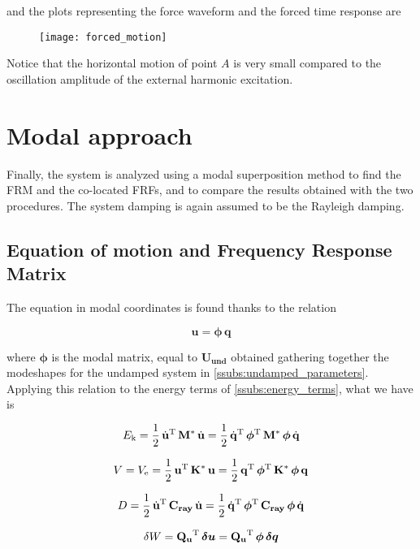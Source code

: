 \documentclass[a4paper,12pt,oneside]{article}
\begin{document}
and the plots representing the force waveform and the forced time response are

\begin{figure}[h]
	\hspace{-70pt}
	\texttt{[image: forced\_motion]}
\end{figure}

Notice that the horizontal motion of point $ A $ is very small compared to the oscillation amplitude of the external harmonic excitation.


\section{Modal approach}

Finally, the system is analyzed using a modal superposition method to find the FRM and the co-located FRFs, and to compare the results obtained with the two procedures. The system damping is again assumed to be the Rayleigh damping.

\subsection{Equation of motion and Frequency Response Matrix}

The equation in modal coordinates is found thanks to the relation

\[ \mathbf{u} = \bm{\phi} \, \mathbf{q} \]

where $ \bm{\phi} $ is the modal matrix, equal to $ \mathbf{U_{und}} $ obtained gathering together the modeshapes for the undamped system in \ref{ssubs:undamped_parameters}. Applying this relation to the energy terms of \ref{ssubs:energy_terms}, what we have is

\[
	E_\textup{k} =
		\frac{1}{2} \, \dot{\mathbf{u}}^\textup{T} \, \mathbf{M^*} \, \dot{\mathbf{u}} =
		\frac{1}{2} \, \dot{\mathbf{q}}^\textup{T} \,	\bm{\phi}^\textup{T} \,
		\mathbf{M^*} \, \bm{\phi} \, \dot{\mathbf{q}}
\]

\[
	V = V_\textup{e} =
		\frac{1}{2} \, \mathbf{u}^\textup{T} \, \mathbf{K^*} \, \mathbf{u} =
		\frac{1}{2} \, \mathbf{q}^\textup{T} \,	\bm{\phi}^\textup{T} \,
		\mathbf{K^*} \, \bm{\phi} \, \mathbf{q}
\]

\[
	D = \frac{1}{2} \, \dot{\mathbf{u}}^\textup{T} \,	\mathbf{C_{ray}} \,
		\dot{\mathbf{u}} =
		\frac{1}{2} \, \dot{\mathbf{q}}^\textup{T} \,	\bm{\phi}^\textup{T} \,
		\mathbf{C_{ray}} \, \bm{\phi} \, \dot{\mathbf{q}}
\]

\[
	\delta W = \mathbf{Q_u}^\textup{T} \, \bm{\delta u} =
		\mathbf{Q_u}^\textup{T} \, \bm{\phi} \, \bm{\delta q}
\]
\end{document}

